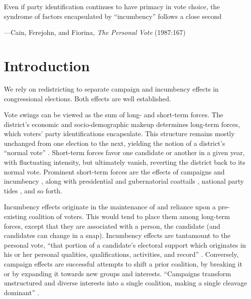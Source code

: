\documentclass[letter,12pt]{article}
\begin{document}
\epigraph{Even if party identification continues to have primacy in vote choice, the syndrome of factors encapsulated by ``incumbency'' follows a close second}{---Cain, Ferejohn, and Fiorina, \emph{The Personal Vote} (1987:167)}

\onehalfspacing

\section{Introduction}

We rely on redistricting to separate campaign and incumbency effects in congressional elections. Both effects are well established.

Vote swings can be viewed as the sum of long- and short-term forces. The district's economic and socio-demographic makeup determines long-term forces, which voters' party identifications encapsulate. This structure remains mostly unchanged from one election to the next, yielding the notion of a district's ``normal vote'' \citep{converse.1966}. Short-term forces favor one candidate or another in a given year, with fluctuating intensity, but ultimately vanish, reverting the district back to its normal vote. Prominent short-term forces are the effects of campaigns \citep{moreno.decisElec.2009,downs.1957,jacobson.1990spending} and incumbency \citep{mayhew1974vanishingMg,erikson1971incumbency,gelman.king.1991incumbency}, along with presidential \citep{ferejohn.calvert.1984} and gubernatorial coattails \citep{magar.gubCoatMx.2012}, national party tides \citep[][:104-7]{cox.mccubbins.2007leviath2nd}, and so forth. 

Incumbency effects originate in the maintenance of and reliance upon a pre-existing coalition of voters. This would tend to place them among long-term forces, except that they are associated with a person, the candidate (and candidates can change in a snap). Incumbency effects are tantamount to the personal vote, ``that portion of a candidate's electoral support which originates in his or her personal qualities, qualifications, activities, and record'' \citep[][:9]{cain.etal.1987}. Conversely, campaign effects are successful attempts to shift a prior coalition, by breaking it or by expanding it towards new groups and interests. ``Campaigns transform unstructured and diverse interests into a single coalition, making a single cleavage dominant'' \citep[][:12]{popkin.1991}. 
\end{document}

